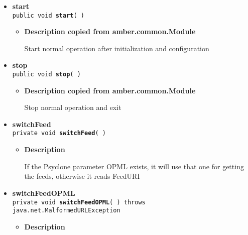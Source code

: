 {{{\begin{itemize}
{\begin{itemize}
{Parse, read all items and register the channel in the poller to be updated.
}
\item{
{\bf Parameters}
  \begin{itemize}
   \item{
{\tt url} -- }
  \end{itemize}
}%
\end{itemize}
}%
 \item{ 
{\bf start}\\
{\tt public void\ {\bf start}(  )
\label{amber.crawler.RSS.start()}}%
\begin{itemize}
\item{
{\bf Description copied from amber.common.Module{\small {}} }

Start normal operation after initialization and configuration
}
\end{itemize}
}%
 \item{ 
{\bf stop}\\
{\tt public void\ {\bf stop}(  )
\label{amber.crawler.RSS.stop()}}%
\begin{itemize}
\item{
{\bf Description copied from amber.common.Module{\small {}} }

Stop normal operation and exit
}
\end{itemize}
}%
 \item{ 
{\bf switchFeed}\\
{\tt private void\ {\bf switchFeed}(  )
\label{amber.crawler.RSS.switchFeed()}}%
\begin{itemize}
\item{
{\bf Description}

If the Psyclone parameter OPML exists, it will use that one for getting the feeds, otherwise it reads FeedURI
}
\end{itemize}
}%
 \item{ 
{\bf switchFeedOPML}\\
{\tt private void\ {\bf switchFeedOPML}(  ) throws java.net.MalformedURLException
\label{amber.crawler.RSS.switchFeedOPML()}}%
\begin{itemize}
\item{
{\bf Description}

}
\end{itemize}}
\end{itemize}}}}
